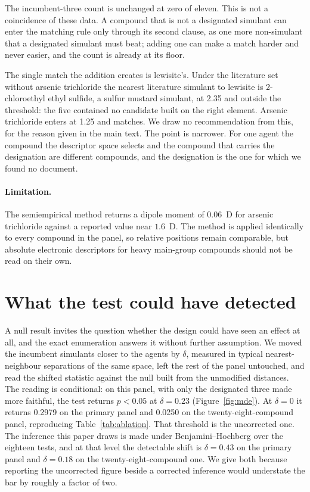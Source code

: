 \documentclass[11pt,a4paper]{article}
\begin{document}
The incumbent-three count is unchanged at zero of eleven. This is not a
coincidence of these data. A compound that is not a designated simulant can
enter the matching rule only through its second clause, as one more
non-simulant that a designated simulant must beat; adding one can make a match
harder and never easier, and the count is already at its floor.

The single match the addition creates is lewisite's. Under the literature set
without arsenic trichloride the nearest literature simulant to lewisite is
2-chloroethyl ethyl sulfide, a sulfur mustard simulant, at 2.35 and outside
the threshold: the five contained no candidate built on the right element.
Arsenic trichloride enters at 1.25 and matches. We draw no recommendation from
this, for the reason given in the main text. The point is narrower. For one
agent the compound the descriptor space selects and the compound that carries
the designation are different compounds, and the designation is the one for
which we found no document.

\paragraph*{Limitation.}
The semiempirical method returns a dipole moment of $0.06$~D for arsenic
trichloride against a reported value near $1.6$~D. The method is applied
identically to every compound in the panel, so relative positions remain
comparable, but absolute electronic descriptors for heavy main-group compounds
should not be read on their own.

\section{What the test could have detected}
\label{res:mde}

A null result invites the question whether the design could have seen an effect
at all, and the exact enumeration answers it without further assumption. We
moved the incumbent simulants closer to the agents by $\delta$, measured in
typical nearest-neighbour separations of the same space, left the rest of the
panel untouched, and read the shifted statistic against the null built from the
unmodified distances. The reading is conditional: on this panel, with only the
designated three made more faithful, the test returns $p<0.05$ at
$\delta = 0.23$ (Figure~\ref{fig:mde}). At $\delta = 0$ it returns 0.2979 on
the primary panel and 0.0250 on the twenty-eight-compound panel, reproducing
Table~\ref{tab:ablation}. That threshold is the uncorrected one. The inference
this paper draws is made under Benjamini--Hochberg over the eighteen tests, and
at that level the detectable shift is $\delta = 0.43$ on the primary panel and
$\delta = 0.18$ on the twenty-eight-compound one. We give both because
reporting the uncorrected figure beside a corrected inference would understate
the bar by roughly a factor of two.
\end{document}
